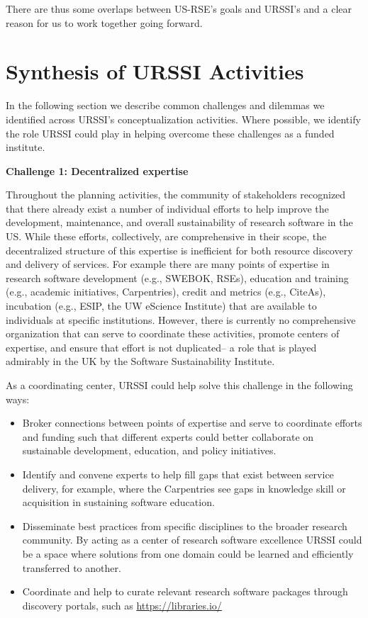 \documentclass[
]{book}
\begin{document}
There are thus some overlaps between US-RSE's goals and URSSI's and a clear reason
for us to work together going forward.

\hypertarget{synthesis-of-urssi-activities}{%
\section{Synthesis of URSSI Activities}\label{synthesis-of-urssi-activities}}

In the following section we describe common challenges and dilemmas we
identified across URSSI's conceptualization activities. Where possible, we identify
the role URSSI could play in helping overcome these challenges as a funded institute.

\textbf{Challenge 1: Decentralized expertise}

Throughout the planning activities, the community of stakeholders recognized
that there already exist a number of individual efforts to help improve the
development, maintenance, and overall sustainability of research software in
the US. While these efforts, collectively, are comprehensive in their scope,
the decentralized structure of this expertise is inefficient for both resource
discovery and delivery of services. For example there are many points of expertise
in research software development (e.g., SWEBOK, RSEs), education and training
(e.g., academic initiatives, Carpentries), credit and metrics (e.g., CiteAs),
incubation (e.g., ESIP, the UW eScience Institute) that are available to
individuals at specific institutions. However, there is currently no comprehensive
organization that can serve to coordinate these activities, promote centers of
expertise, and ensure that effort is not duplicated-- a role that is played
admirably in the UK by the Software Sustainability Institute.

As a coordinating center, URSSI could help solve this challenge in the following ways:

\begin{itemize}
\item
  Broker connections between points of expertise and serve to coordinate
  efforts and funding such that different experts could better collaborate on
  sustainable development, education, and policy initiatives.
\item
  Identify and convene experts to help fill gaps that exist between service
  delivery, for example, where the Carpentries see gaps in knowledge skill or
  acquisition in sustaining software education.
\item
  Disseminate best practices from specific disciplines to the broader
  research community. By acting as a center of research software excellence
  URSSI could be a space where solutions from one domain could be learned and
  efficiently transferred to another.
\item
  Coordinate and help to curate relevant research software packages through
  discovery portals, such as \url{https://libraries.io/}
\end{itemize}
\end{document}
